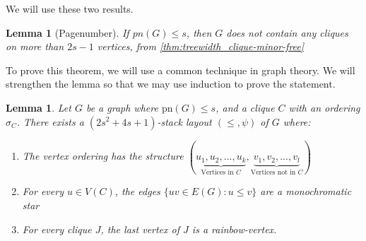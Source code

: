 \documentclass[]{report}
\newcommand{\pn}{\text{pn}}
\newtheorem{lemma}[theorem]{Lemma}
\theoremstyle{definition}
\numberwithin{theorem}{section}
\numberwithin{equation}{section}
\begin{document}
We will use these two results.
\begin{lemma}[Pagenumber]
	If $pn(G) \leq s$, then $G$ does not contain any cliques on more than $2s-1$ vertices, from \cref{thm:treewidth_clique-minor-free}
\end{lemma}

To prove this theorem, we will use a common technique in graph theory. We will strengthen the lemma so that we may use induction to prove the statement.
\begin{lemma}\label{lem:Hickingbotham_Lemma}
	Let $G$ be a graph where $\pn(G) \leq s$, and a clique $C$ with an ordering $\sigma_C$. There exists a $(2s^2 + 4s + 1)$-stack layout $(\leq, \psi)$ of $G$ where:
	\begin{enumerate}
		\item The vertex ordering has the structure $(\underbrace{u_1, u_2, ..., u_k}_{\text{Vertices in } C}, \underbrace{v_1, v_2, ..., v_l}_{\text{Vertices not in }C})$
		\item For every $u \in V(C)$, the edges $\lbrace uv \in E(G) : u \leq v \rbrace$ are a monochromatic star
		\item For every clique $J$, the last vertex of $J$ is a rainbow-vertex. 
	\end{enumerate}
\end{lemma}
\end{document}
